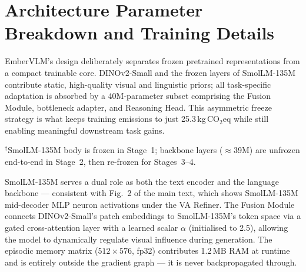 \documentclass[runningheads]{llncs}
\begin{document}
\section{Architecture Parameter Breakdown and Training Details}
\label{sec:supp-arch}

EmberVLM's design deliberately separates frozen pretrained representations from a
compact trainable core. DINOv2-Small and the frozen layers of SmolLM-135M contribute
static, high-quality visual and linguistic priors; all task-specific adaptation is
absorbed by a 40M-parameter subset comprising the Fusion Module, bottleneck adapter,
and Reasoning Head. This asymmetric freeze strategy is what keeps training emissions
to just 25.3\,kg\,CO$_2$eq while still enabling meaningful downstream task gains.

\begin{table}[ht]
\centering
\caption{Parameter breakdown. Total: 164M; trainable: 40M.}
\label{tab:params}
\setlength{\tabcolsep}{5pt}

\end{table}

{\scriptsize $^\dagger$SmolLM-135M body is frozen in Stage~1; backbone layers ($\approx$39M) are
unfrozen end-to-end in Stage~2, then re-frozen for Stages~3--4.}

\smallskip\noindent
SmolLM-135M serves a dual role as both the text encoder and the language backbone —
consistent with Fig.~2 of the main text, which shows SmolLM-135M mid-decoder MLP
neuron activations under the VA Refiner. The Fusion Module connects DINOv2-Small's
patch embeddings to SmolLM-135M's token space via a gated cross-attention layer with
a learned scalar $\alpha$ (initialised to 2.5), allowing the model to dynamically
regulate visual influence during generation. The episodic memory matrix
($512\!\times\!576$, fp32) contributes 1.2\,MB RAM at runtime and is entirely outside
the gradient graph — it is never backpropagated through.
\end{document}
